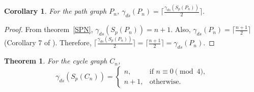 \documentclass{article}
\newtheorem{theorem}{Theorem}[section]
\newtheorem{corollary}{Corollary}[section]
\begin{document}
\begin{corollary}
For the path graph $P_n$, $\gamma_{ds}(P_n)= \lceil \frac{\gamma_{ds}(S_p(P_n))}{2} \rceil.$
\end{corollary}
\begin{proof}
From theorem~\ref{SPN}, $\gamma_{ds}(S_p(P_n)) = n+1.$ Also, $\gamma_{ds}(P_n)= \lceil \frac{n+1}{2} \rceil$ (Corollary 7 of \cite{DS}). Therefore, $\lceil \frac{\gamma_{ds}(S_p(P_n))}{2} \rceil= \lceil \frac{n+1}{2} \rceil= \gamma_{ds}(P_n)$. 
\end{proof}
\begin{theorem}\label{SCN}
For the cycle graph $C_n$,
\[
\gamma_{ds}(S_p(C_n))=
\begin{cases}
n, & \text{if } n\equiv 0 \pmod{4},\\
n+1, & \text{otherwise}.
\end{cases}
\]

\end{theorem}
\end{document}
